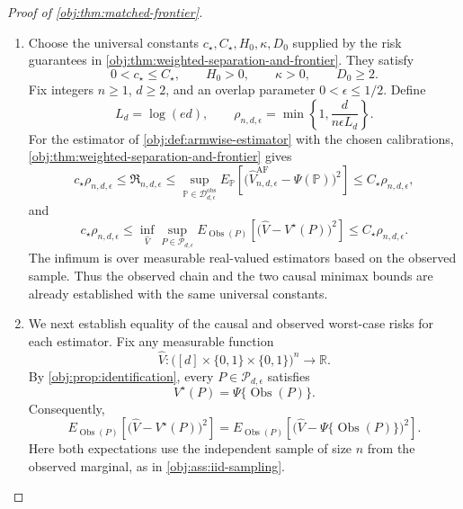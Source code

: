 \begin{proof}[Proof of \cref{obj:thm:matched-frontier}]
\begin{enumerate}
\item Choose the universal constants \(c_\star,C_\star,H_0,\kappa,D_0\) supplied by the risk guarantees in \cref{obj:thm:weighted-separation-and-frontier}. They satisfy
\[
0<c_\star\le C_\star,\qquad H_0>0,\qquad \kappa>0,\qquad D_0\ge2.
\]
Fix integers \(n\ge1\), \(d\ge2\), and an overlap parameter \(0<\epsilon\le1/2\). Define
\[
L_d=\log(ed),
\qquad
\rho_{n,d,\epsilon}
=\min\left\{1,\frac{d}{n\epsilon L_d}\right\}.
\]
For the estimator of \cref{obj:def:armwise-estimator} with the chosen calibrations, \cref{obj:thm:weighted-separation-and-frontier} gives
\[
c_\star\rho_{n,d,\epsilon}
\le \mathfrak R_{n,d,\epsilon}
\le
\sup_{\mathbb P\in\mathcal D_{d,\epsilon}^{\mathrm{obs}}}
E_{\mathbb P}\!\left[
\bigl(\widehat V_{n,d,\epsilon}^{\mathrm{AF}}-\Psi(\mathbb P)\bigr)^2
\right]
\le C_\star\rho_{n,d,\epsilon},
\]
and
\[
c_\star\rho_{n,d,\epsilon}
\le
\inf_{\widehat V}
\sup_{P\in\mathcal P_{d,\epsilon}}
E_{\operatorname{Obs}(P)}\!\left[
\bigl(\widehat V-V^\star(P)\bigr)^2
\right]
\le C_\star\rho_{n,d,\epsilon}.
\]
The infimum is over measurable real-valued estimators based on the observed sample. Thus the observed chain and the two causal minimax bounds are already established with the same universal constants.

\item We next establish equality of the causal and observed worst-case risks for each estimator. Fix any measurable function
\[
\widehat V:
\bigl([d]\times\{0,1\}\times\{0,1\}\bigr)^n
\longrightarrow\mathbb R.
\]
By \cref{obj:prop:identification}, every \(P\in\mathcal P_{d,\epsilon}\) satisfies
\[
V^\star(P)=\Psi\{\operatorname{Obs}(P)\}.
\]
Consequently,
\[
E_{\operatorname{Obs}(P)}\!\left[
\bigl(\widehat V-V^\star(P)\bigr)^2
\right]
=
E_{\operatorname{Obs}(P)}\!\left[
\bigl(\widehat V-\Psi\{\operatorname{Obs}(P)\}\bigr)^2
\right].
\]
Here both expectations use the independent sample of size \(n\) from the observed marginal, as in \cref{obj:ass:iid-sampling}.


\end{enumerate}
\end{proof}
